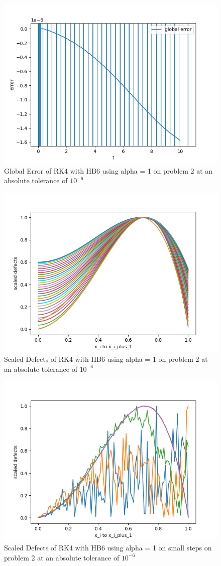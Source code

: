\documentclass{article}
\begin{document}
\begin{figure}[H]
\centering
\includegraphics[width=0.7\linewidth]{./figures/static_alpha_rk4_with_hb6_p2_global_error}
\caption{Global Error of RK4 with HB6 using alpha = 1 on problem 2 at an absolute tolerance of $10^{-6}$}
\label{fig:static_alpha_rk4_with_hb6_p2_global_error}
\end{figure}

\begin{figure}[H]
\centering
\includegraphics[width=0.7\linewidth]{./figures/static_alpha_rk4_with_hb6_p2_scaled_defects}
\caption{Scaled Defects of RK4 with HB6 using alpha = 1 on problem 2 at an absolute tolerance of $10^{-6}$}
\label{fig:static_alpha_rk4_with_hb6_p2_scaled_defects}
\end{figure}

\begin{figure}[H]
\centering
\includegraphics[width=0.7\linewidth]{./figures/static_alpha_rk4_with_hb6_p2_scaled_defects_small_steps}
\caption{Scaled Defects of RK4 with HB6 using alpha = 1 on small steps on problem 2 at an absolute tolerance of $10^{-6}$}
\label{fig:static_alpha_rk4_with_hb6_p2_scaled_defects_small_steps}
\end{figure}
\end{document}
